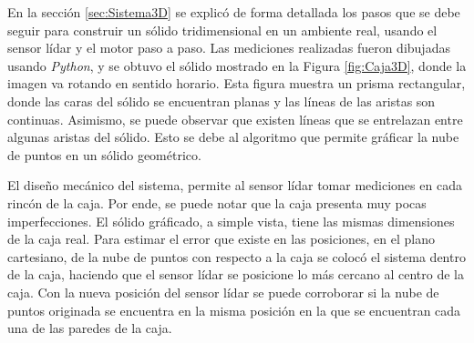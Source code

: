 En la sección \ref{sec:Sistema3D} se explicó de forma detallada los pasos que 
se debe seguir para construir un sólido tridimensional en un ambiente real, 
usando el sensor lídar y el motor paso a paso. Las mediciones realizadas fueron 
dibujadas usando \textit{Python}, y se obtuvo
el sólido mostrado en la Figura \ref{fig:Caja3D}, donde la imagen va rotando en 
sentido horario. Esta figura muestra un prisma rectangular, donde las caras del 
sólido se encuentran planas y las líneas de las aristas son continuas. Asimismo, 
se puede observar que existen líneas que se entrelazan entre algunas aristas del 
sólido. Esto se debe al algoritmo que permite gráficar la nube de puntos en un 
sólido geométrico.

El diseño mecánico del sistema, permite al sensor lídar tomar mediciones en cada 
rincón de la caja. Por ende, se puede notar que la caja presenta muy pocas 
imperfecciones. El sólido gráficado, a simple vista, tiene las mismas dimensiones 
de la caja real. Para estimar el error que existe en las posiciones, en el 
plano cartesiano, de la nube de puntos con respecto a la caja se colocó el sistema 
dentro de la caja, haciendo que el sensor lídar se posicione lo más cercano al 
centro de la caja. Con la nueva posición del sensor lídar se puede corroborar si 
la nube de puntos originada se encuentra en la misma posición en la que 
se encuentran cada una de las paredes de la caja.


